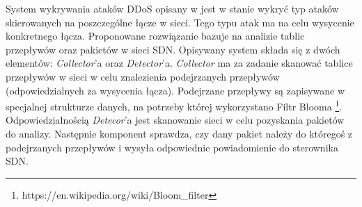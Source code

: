 System wykrywania ataków DDoS opisany w \cite{bloomarticle} jest w stanie wykryć
typ ataków skierowanych na poszczególne łącze w sieci. Tego typu atak ma na celu
wysycenie konkretnego łącza. Proponowane rozwiązanie bazuje na analizie tablic
przepływów oraz pakietów w sieci SDN. Opisywany system składa się z dwóch
elementów: \textit{Collector}'a oraz \textit{Detector}'a. \textit{Collector} ma
za zadanie skanować tablice przepływów w sieci w celu znalezienia podejrzanych
przepływów (odpowiedzialnych za wysycenia łącza). Podejrzane przepływy są
zapisywane w specjalnej strukturze danych, na potrzeby której wykorzystano Filtr
Blooma \footnote{https://en.wikipedia.org/wiki/Bloom\_filter}.
Odpowiedzialnością \textit{Detecor}'a jest skanowanie sieci w celu pozyskania
pakietów do analizy. Następnie komponent sprawdza, czy dany pakiet należy do
któregoś z podejrzanych przepływów i wysyła odpowiednie powiadomienie do
sterownika SDN.